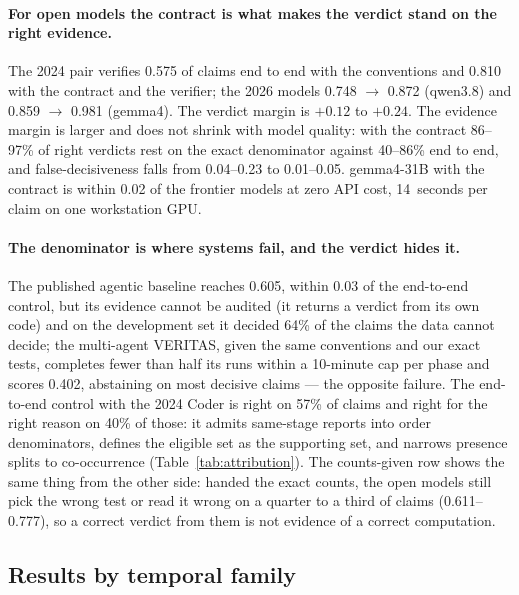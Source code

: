 \paragraph{For open models the contract is what makes the verdict stand on the
right evidence.} The 2024 pair verifies 0.575 of claims end to end with the
conventions and 0.810 with the contract and the verifier; the 2026 models
0.748 $\rightarrow$ 0.872 (qwen3.8) and 0.859 $\rightarrow$ 0.981 (gemma4).
The verdict margin is $+0.12$ to $+0.24$. The evidence margin is larger and
does not shrink with model quality: with the contract 86--97\% of right
verdicts rest on the exact denominator against 40--86\% end to end, and
false-decisiveness falls from 0.04--0.23 to 0.01--0.05. gemma4-31B with the
contract is within 0.02 of the frontier models at zero API cost, 14~seconds
per claim on one workstation GPU.

\paragraph{The denominator is where systems fail, and the verdict hides it.}
The published agentic baseline reaches 0.605, within 0.03 of the end-to-end
control, but its evidence cannot be audited (it returns a verdict from its own
code) and on the development set it decided 64\% of the claims the data cannot
decide; the multi-agent VERITAS, given the same conventions and our exact
tests, completes fewer than half its runs within a 10-minute cap per phase
and scores 0.402, abstaining on most decisive claims --- the opposite
failure. The end-to-end control with the 2024 Coder is right on 57\% of claims
and right for the right reason on 40\% of those: it admits same-stage reports
into order denominators, defines the eligible set as the supporting set, and
narrows presence splits to co-occurrence (Table~\ref{tab:attribution}). The
counts-given row shows the same thing from the other side: handed the exact
counts, the open models still pick the wrong test or read it wrong on a
quarter to a third of claims (0.611--0.777), so a correct verdict from them is
not evidence of a correct computation.

\subsection{Results by temporal family}
\label{sec:families}


